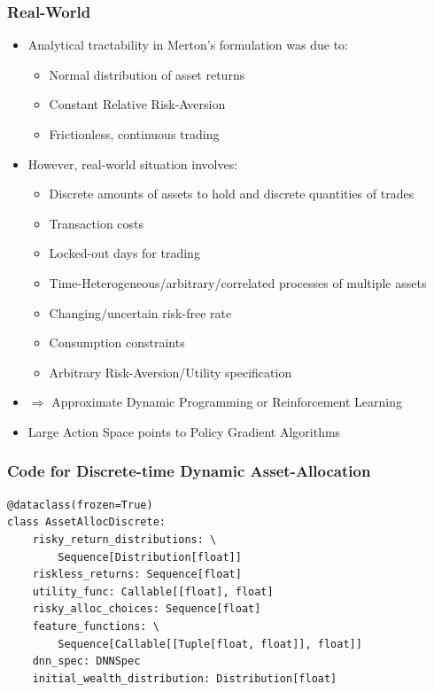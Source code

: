 \documentclass[handout]{beamer}
\begin{document}
\begin{frame}
\frametitle{Real-World}
\pause
\begin{itemize}[<+->]
\item Analytical tractability in Merton's formulation was due to:
\begin{itemize}
\item Normal distribution of asset returns
\item Constant Relative Risk-Aversion
\item Frictionless, continuous trading
\end{itemize}
\item However, real-world situation involves:
\begin{itemize}
\item Discrete amounts of assets to hold and discrete quantities of trades
\item Transaction costs
\item Locked-out days for trading
\item Time-Heterogeneous/arbitrary/correlated processes of multiple assets
\item Changing/uncertain risk-free rate
\item Consumption constraints
\item Arbitrary Risk-Aversion/Utility specification
\end{itemize}
\item $\Rightarrow$ Approximate Dynamic Programming or Reinforcement Learning
\item Large Action Space points to Policy Gradient Algorithms
\end{itemize}
\end{frame}


\begin{frame}[fragile]
\frametitle{Code for Discrete-time Dynamic Asset-Allocation}
\pause
\begin{lstlisting}
@dataclass(frozen=True)
class AssetAllocDiscrete:
    risky_return_distributions: \
        Sequence[Distribution[float]]
    riskless_returns: Sequence[float]
    utility_func: Callable[[float], float]
    risky_alloc_choices: Sequence[float]
    feature_functions: \
        Sequence[Callable[[Tuple[float, float]], float]]
    dnn_spec: DNNSpec
    initial_wealth_distribution: Distribution[float]
\end{lstlisting}    
\end{frame}    
\end{document}
